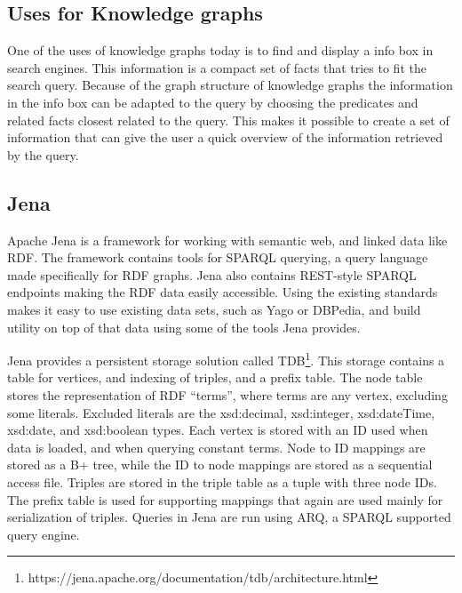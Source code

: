 
\subsection{Uses for Knowledge graphs}
One of the uses of knowledge graphs today is to find and display a info box in search engines. This information is a compact set of facts that tries to fit the search query. Because of the graph structure of knowledge graphs the information in the info box can be adapted to the query by choosing the predicates and related facts closest related to the query. This makes it possible to create a set of information that can give the user a quick overview of the information retrieved by the query.

\subsection{Jena}
Apache Jena is a framework for working with semantic web, and linked data like RDF. The framework contains tools for SPARQL querying, a query language made specifically for RDF graphs. Jena also contains REST-style SPARQL endpoints making the RDF data easily accessible. Using the existing standards makes it easy to use existing data sets, such as Yago or DBPedia, and build utility on top of that data using some of the tools Jena provides.

Jena provides a persistent storage solution called TDB\footnote{https://jena.apache.org/documentation/tdb/architecture.html}. This storage contains a table for vertices, and indexing of triples, and a prefix table. The node table stores the representation of RDF ``terms'', where terms are any vertex, excluding some literals. Excluded literals are the xsd:decimal, xsd:integer, xsd:dateTime, xsd:date, and xsd:boolean types. Each vertex is stored with an ID used when data is loaded, and when querying constant terms. Node to ID mappings are stored as a B+ tree, while the ID to node mappings are stored as a sequential access file. Triples are stored in the triple table as a tuple with three node IDs. The prefix table is used for supporting mappings that again are used mainly for serialization of triples. Queries in Jena are run using ARQ, a SPARQL supported query engine.

\glsresetall
